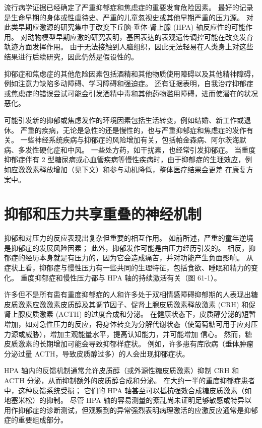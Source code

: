 流行病学证据已经确定了严重抑郁症和焦虑症的重要发育危险因素。 最好的记录是生命早期的身体或性虐待史、严重的儿童忽视史或其他早期严重的压力源。 对此类早期应激源的研究集中于改变下丘脑-垂体-肾上腺 (HPA) 轴反应性的可能作用。 对动物模型早期应激的研究表明，基因表达的表观遗传调控可能在改变发育轨迹方面发挥作用。 由于无法接触到人脑组织，因此无法轻易在人类身上对这些结果进行后续研究，因此仍然是假设性的。

抑郁症和焦虑症的其他危险因素包括酒精和其他物质使用障碍以及其他精神障碍，例如注意力缺陷多动障碍、学习障碍和强迫症。 还有证据表明，自我治疗抑郁症或焦虑症的错误尝试可能会引发酒精中毒和其他药物滥用障碍，进而使潜在的状况恶化。

可能引发新的抑郁或焦虑发作的环境因素包括生活转变，例如结婚、新工作或退休。 严重的疾病，无论是急性的还是慢性的，也与严重抑郁症和焦虑症的发作有关。 一些神经系统疾病与抑郁症的风险增加有关，包括帕金森病、阿尔茨海默病、多发性硬化症和中风。 一些处方药，如干扰素，也经常引发抑郁症。 当重度抑郁症伴有 2 型糖尿病或心血管疾病等慢性疾病时，由于抑郁症的生理效应，例如应激激素释放增加（见下文）和参与动机降低，整体医疗结果会更差 在康复方案中。

\section{抑郁和压力共享重叠的神经机制}
抑郁和对压力的反应表现出复杂但重要的相互作用。 如前所述，严重的童年逆境是抑郁症的发展风险因素； 此外，抑郁发作可能是由压力经历引发的。 相反，抑郁症的经历本身就是有压力的，因为它会造成痛苦，并对功能产生负面影响。 从症状上看，抑郁症与慢性压力有一些共同的生理特征，包括食欲、睡眠和精力的变化。 重度抑郁症和慢性压力都与 HPA 轴的持续激活有关（图 61-1）。

许多但不是所有患有重度抑郁症的人和许多处于双相情感障碍抑郁期的人表现出糖皮质激素应激激素皮质醇及其调节因子、促肾上腺皮质激素释放激素 (CRH) 和促肾上腺皮质激素 (ACTH) 的过度合成和分泌。 在健康状态下，皮质醇分泌的短暂增加，如对急性压力的反应，将身体转变为分解代谢状态（使葡萄糖可用于应对压力源或威胁），增加主观能量水平，提高认知能力，并可能增加 信心。 然而，糖皮质激素的长期增加可能会导致抑郁样症状。 例如，许多患有库欣病（垂体肿瘤分泌过量 ACTH，导致皮质醇过多）的人会出现抑郁症状。

HPA 轴内的反馈机制通常允许皮质醇（或外源性糖皮质激素）抑制 CRH 和 ACTH 分泌，从而抑制额外的皮质醇合成和分泌。 在大约一半的重度抑郁症患者中，这种反馈系统受损； 它们的 HPA 轴甚至可以抵抗强效合成糖皮质激素（如地塞米松）的抑制。 尽管 HPA 轴的容易测量的紊乱尚未证明足够敏感或特异以用作抑郁症的诊断测试，但观察到的异常强烈表明病理激活的应激反应通常是抑郁症的重要组成部分。

